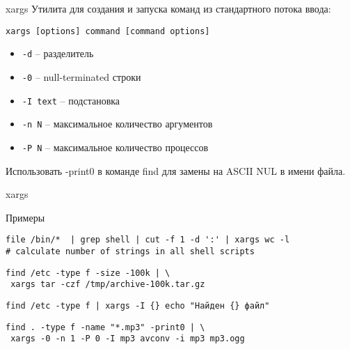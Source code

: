 \begin{frame}[fragile]{xargs}
			Утилита для создания и запуска команд из стандартного потока ввода:
		\begin{verbatim}
xargs [options] command [command options]
                \end{verbatim}
		\begin{itemize}
			\item {\tt -d} -- разделитель
			\item {\tt -0} -- null-terminated строки
			\item {\tt -I text} -- подстановка
			\item {\tt -n N} -- максимальное количество аргументов
			\item {\tt -P N} -- максимальное количество процессов
		\end{itemize}

Использовать -print0 в команде find для замены на ASCII NUL в имени файла.
\end{frame}

\begin{frame}[fragile]{xargs}
	\begin{block}{Примеры}
		\begin{verbatim}
file /bin/*  | grep shell | cut -f 1 -d ':' | xargs wc -l 
# calculate number of strings in all shell scripts
                \end{verbatim}
		\begin{verbatim}
find /etc -type f -size -100k | \
 xargs tar -czf /tmp/archive-100k.tar.gz
                \end{verbatim}
		\begin{verbatim}
find /etc -type f | xargs -I {} echo "Найден {} файл"
                \end{verbatim}

		\begin{verbatim}
find . -type f -name "*.mp3" -print0 | \
 xargs -0 -n 1 -P 0 -I mp3 avconv -i mp3 mp3.ogg
                \end{verbatim}
	
	\end{block}
\end{frame}
